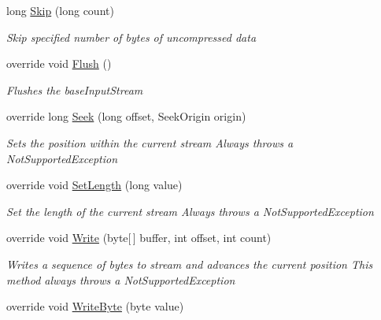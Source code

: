 \begin{DoxyCompactItemize}
long \hyperlink{class_i_c_sharp_code_1_1_sharp_zip_lib_1_1_zip_1_1_compression_1_1_streams_1_1_inflater_input_stream_ac10ceeea77e8db40068875b66ca86f42}{Skip} (long count)
\begin{DoxyCompactList}\small\item\em Skip specified number of bytes of uncompressed data \end{DoxyCompactList}\item 
override void \hyperlink{class_i_c_sharp_code_1_1_sharp_zip_lib_1_1_zip_1_1_compression_1_1_streams_1_1_inflater_input_stream_a8a6bdcbf6dad8f9b58ca65127e7ac523}{Flush} ()
\begin{DoxyCompactList}\small\item\em Flushes the base\+Input\+Stream \end{DoxyCompactList}\item 
override long \hyperlink{class_i_c_sharp_code_1_1_sharp_zip_lib_1_1_zip_1_1_compression_1_1_streams_1_1_inflater_input_stream_ade431915c314b6f8fb4c08f6f55ce14d}{Seek} (long offset, Seek\+Origin origin)
\begin{DoxyCompactList}\small\item\em Sets the position within the current stream Always throws a Not\+Supported\+Exception \end{DoxyCompactList}\item 
override void \hyperlink{class_i_c_sharp_code_1_1_sharp_zip_lib_1_1_zip_1_1_compression_1_1_streams_1_1_inflater_input_stream_aff76ed02af3493e545297c262127b370}{Set\+Length} (long value)
\begin{DoxyCompactList}\small\item\em Set the length of the current stream Always throws a Not\+Supported\+Exception \end{DoxyCompactList}\item 
override void \hyperlink{class_i_c_sharp_code_1_1_sharp_zip_lib_1_1_zip_1_1_compression_1_1_streams_1_1_inflater_input_stream_aba845c76ab368c90a6e95de12e4d4d45}{Write} (byte\mbox{[}$\,$\mbox{]} buffer, int offset, int count)
\begin{DoxyCompactList}\small\item\em Writes a sequence of bytes to stream and advances the current position This method always throws a Not\+Supported\+Exception \end{DoxyCompactList}\item 
override void \hyperlink{class_i_c_sharp_code_1_1_sharp_zip_lib_1_1_zip_1_1_compression_1_1_streams_1_1_inflater_input_stream_a1bc0509214f208964facea233b8ff8f3}{Write\+Byte} (byte value)

\end{DoxyCompactItemize}
